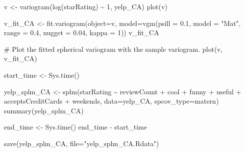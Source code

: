 \documentclass[
  12pt,
  letterpaper,
  DIV=11,
  numbers=noendperiod]{scrartcl}
\newenvironment{Shaded}{\begin{snugshade}}{\end{snugshade}}
\newcommand{\AttributeTok}[1]{\textcolor[rgb]{0.98,0.46,0.51}{#1}}
\newcommand{\CommentTok}[1]{\textcolor[rgb]{0.42,0.45,0.49}{#1}}
\newcommand{\DecValTok}[1]{\textcolor[rgb]{0.47,0.72,1.00}{#1}}
\newcommand{\FloatTok}[1]{\textcolor[rgb]{0.47,0.72,1.00}{#1}}
\newcommand{\FunctionTok}[1]{\textcolor[rgb]{0.70,0.57,0.94}{#1}}
\newcommand{\NormalTok}[1]{\textcolor[rgb]{0.88,0.89,0.91}{#1}}
\newcommand{\OtherTok}[1]{\textcolor[rgb]{0.70,0.57,0.94}{#1}}
\newcommand{\SpecialCharTok}[1]{\textcolor[rgb]{0.47,0.72,1.00}{#1}}
\newcommand{\StringTok}[1]{\textcolor[rgb]{0.62,0.80,1.00}{#1}}
\begin{document}
\begin{Shaded}
\begin{Highlighting}[]
\NormalTok{v }\OtherTok{\textless{}{-}} \FunctionTok{variogram}\NormalTok{(}\FunctionTok{log}\NormalTok{(starRating) }\SpecialCharTok{\textasciitilde{}} \DecValTok{1}\NormalTok{, yelp\_CA)}
\FunctionTok{plot}\NormalTok{(v)}
\end{Highlighting}
\end{Shaded}

\begin{Shaded}
\begin{Highlighting}[]
\NormalTok{v\_fit\_CA }\OtherTok{\textless{}{-}} \FunctionTok{fit.variogram}\NormalTok{(}\AttributeTok{object=}\NormalTok{v, }
                           \AttributeTok{model=}\FunctionTok{vgm}\NormalTok{(}\AttributeTok{psill =} \FloatTok{0.1}\NormalTok{, }\AttributeTok{model =} \StringTok{"Mat"}\NormalTok{, }
                                     \AttributeTok{range =} \FloatTok{0.4}\NormalTok{, }\AttributeTok{nugget =} \FloatTok{0.04}\NormalTok{, }\AttributeTok{kappa =} \DecValTok{1}\NormalTok{))}
\NormalTok{v\_fit\_CA}

\CommentTok{\# Plot the fitted spherical variogram with the sample variogram.}
\FunctionTok{plot}\NormalTok{(v, v\_fit\_CA)}
\end{Highlighting}
\end{Shaded}

\begin{Shaded}
\begin{Highlighting}[]
\NormalTok{start\_time }\OtherTok{\textless{}{-}} \FunctionTok{Sys.time}\NormalTok{()}


\NormalTok{yelp\_splm\_CA }\OtherTok{\textless{}{-}} \FunctionTok{splm}\NormalTok{(starRating }\SpecialCharTok{\textasciitilde{}}\NormalTok{ reviewCount }\SpecialCharTok{+}\NormalTok{ cool }\SpecialCharTok{+}\NormalTok{ funny }\SpecialCharTok{+}\NormalTok{ useful }\SpecialCharTok{+}\NormalTok{ acceptsCreditCards }\SpecialCharTok{+}\NormalTok{ weekends, }\AttributeTok{data=}\NormalTok{yelp\_CA, }\AttributeTok{spcov\_type=}\StringTok{\textquotesingle{}matern\textquotesingle{}}\NormalTok{)}
\FunctionTok{summary}\NormalTok{(yelp\_splm\_CA)}

\NormalTok{end\_time }\OtherTok{\textless{}{-}} \FunctionTok{Sys.time}\NormalTok{()}
\NormalTok{end\_time }\SpecialCharTok{{-}}\NormalTok{ start\_time}
\end{Highlighting}
\end{Shaded}

\begin{Shaded}
\begin{Highlighting}[]
\FunctionTok{save}\NormalTok{(yelp\_splm\_CA, }\AttributeTok{file=}\StringTok{"yelp\_splm\_CA.Rdata"}\NormalTok{)}
\end{Highlighting}
\end{Shaded}
\end{document}

